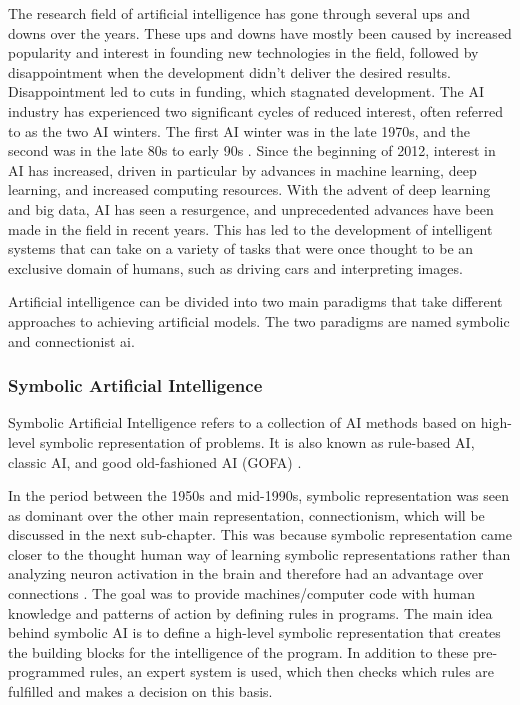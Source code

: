 The research field of artificial intelligence has gone through several ups and downs over the years. These ups and downs have mostly been caused by increased popularity and interest in founding new technologies in the field, followed by disappointment when the development didn't deliver the desired results. Disappointment led to cuts in funding, which stagnated development. The AI industry has experienced two significant cycles of reduced interest, often referred to as the two AI winters. The first AI winter was in the late 1970s, and the second was in the late 80s to early 90s \cite{floridiAIItsNew2020}. Since the beginning of 2012, interest in AI has increased, driven in particular by advances in machine learning, deep learning, and increased computing resources. With the advent of deep learning and big data, AI has seen a resurgence, and unprecedented advances have been made in the field in recent years. This has led to the development of intelligent systems that can take on a variety of tasks that were once thought to be an exclusive domain of humans, such as driving cars and interpreting images. 

Artificial intelligence can be divided into two main paradigms that take different approaches to achieving artificial models. The two paradigms are named symbolic and connectionist \gls{ai}.


\subsubsection{Symbolic Artificial Intelligence}


Symbolic Artificial Intelligence refers to a collection of AI methods based on high-level symbolic representation of problems. It is also known as rule-based AI, classic AI, and good old-fashioned AI (GOFA) \cite{haugelandArtificialIntelligenceVery1989}. 

In the period between the 1950s and mid-1990s, symbolic representation was seen as dominant over the other main representation, connectionism, which will be discussed in the next sub-chapter. This was because symbolic representation came closer to the thought human way of learning symbolic representations rather than analyzing neuron activation in the brain and therefore had an advantage over connections \cite{garneloReconcilingDeepLearning2019}. 
The goal was to provide machines/computer code with human knowledge and patterns of action by defining rules in programs. The main idea behind symbolic AI is to define a high-level symbolic representation that creates the building blocks for the intelligence of the program. In addition to these pre-programmed rules, an expert system is used, which then checks which rules are fulfilled and makes a decision on this basis.

